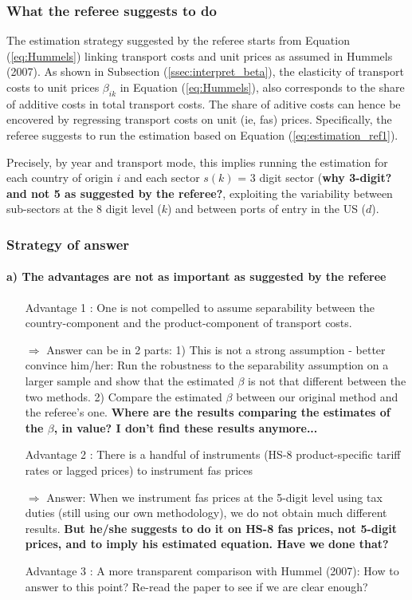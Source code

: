 \documentclass[a4paper,12pt]{article}
\begin{document}
\subsubsection{What the referee suggests to do}

The estimation strategy suggested by the referee starts from Equation (\ref{eq:Hummels}) linking transport costs and unit prices as assumed in Hummels (2007). As shown in Subsection (\ref{ssec:interpret_beta}), the elasticity of transport costs to unit prices $\beta_{ik}$ in Equation (\ref{eq:Hummels}), also corresponds to the share of additive costs in total transport costs. The share of aditive costs can hence be encovered by regressing transport costs on unit (ie, fas) prices. Specifically, the referee suggests to run the estimation based on Equation (\ref{eq:estimation_ref1}).

Precisely, by year and transport mode, this implies running the estimation for each country of origin $i$ and each sector $s(k)$ = 3 digit sector (\textbf{why 3-digit? and not 5 as suggested by the referee?}, exploiting the variability between sub-sectors at the 8 digit level ($k$) and between ports of entry in the US ($d$).

\subsubsection{Strategy of answer}

\paragraph{a) The advantages are not as important as suggested by the referee}
\begin{itemize}
\item[Advantage 1]: One is not compelled to assume separability between the country-component and the product-component of transport costs.
\item[$\Rightarrow$] Answer can be in 2 parts: 1) This is not a strong assumption - better convince him/her: Run the robustness to the separability assumption on a larger sample and show that the estimated $\beta$ is not that different between the two methods. 2) Compare the estimated $\beta$ between our original method and the referee's one. \textbf{Where are the results comparing the estimates of the $\beta$, in value? I don't find these results anymore...}


    
    
\item[Advantage 2]: There is a handful of instruments (HS-8 product-specific tariff rates or lagged prices) to instrument fas prices
\item[$\Rightarrow$] Answer: When we instrument fas prices at the 5-digit level using tax duties (still using our own methodology), we do not obtain much different results. \textbf{But he/she suggests to do it on HS-8 fas prices, not 5-digit prices, and to imply his estimated equation. Have we done that?}
\item[Advantage 3]: A more transparent comparison with Hummel (2007): How to answer to this point? Re-read the paper to see if we are clear enough?
\end{itemize}
\end{document}
